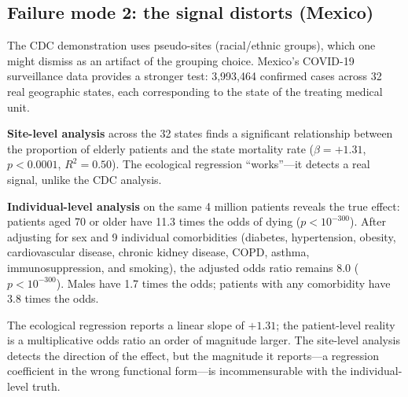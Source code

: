 \documentclass{article}
\begin{document}
\subsection{Failure mode 2: the signal distorts (Mexico)}

The CDC demonstration uses pseudo-sites (racial/ethnic groups), which one
might dismiss as an artifact of the grouping choice.  Mexico's COVID-19
surveillance data provides a stronger test: 3,993,464 confirmed cases across
32 real geographic states, each corresponding to the state of the treating
medical unit.

\textbf{Site-level analysis} across the 32 states finds a significant
relationship between the proportion of elderly patients and the state
mortality rate ($\beta = +1.31$, $p < 0.0001$, $R^2 = 0.50$).  The
ecological regression ``works''---it detects a real signal, unlike the CDC
analysis.

\textbf{Individual-level analysis} on the same 4 million patients reveals the
true effect: patients aged 70 or older have 11.3 times the odds of dying
($p < 10^{-300}$).  After adjusting for sex and 9 individual comorbidities
(diabetes, hypertension, obesity, cardiovascular disease, chronic kidney
disease, COPD, asthma, immunosuppression, and smoking), the adjusted odds
ratio remains 8.0 ($p < 10^{-300}$).  Males have 1.7 times the odds;
patients with any comorbidity have 3.8 times the odds.

The ecological regression reports a linear slope of $+1.31$; the
patient-level reality is a multiplicative odds ratio an order of magnitude
larger.  The site-level analysis detects the direction of the effect, but the
magnitude it reports---a regression coefficient in the wrong functional
form---is incommensurable with the individual-level truth.
\end{document}
